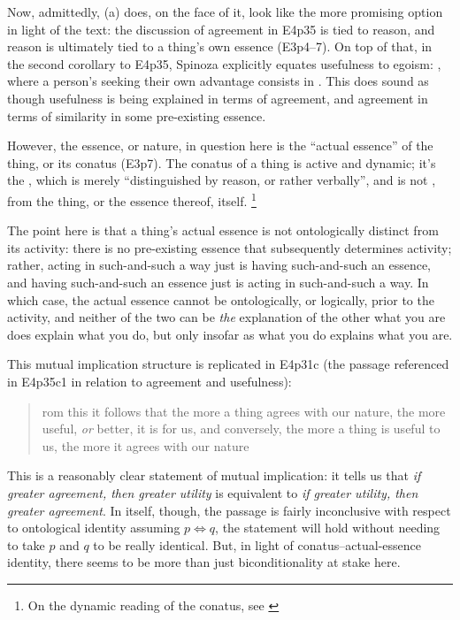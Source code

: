 \documentclass{article}
\newcommand{\dash}{\unskip{—}}
\begin{document}
Now, admittedly, (a) does, on the face of it, look like the more promising option in light of the text: the discussion of agreement in E4p35 is tied to reason, and reason is ultimately tied to a thing's own essence (E3p4–7). On top of that, in the second corollary to E4p35, Spinoza explicitly equates usefulness to egoism: , where a person's seeking their own advantage consists in . This does sound as though usefulness is being explained in terms of agreement, and agreement in terms of similarity in some pre-existing essence.

However, the essence, or nature, in question here is the \enquote{actual essence} of the thing, or its conatus (E3p7). The conatus of a thing is active and dynamic; it's the , which is merely \enquote{distinguished by reason, or rather verbally}, and is not , from the thing, or the essence thereof, itself.
\footnote{On the dynamic reading of the conatus, see \cite[][Part 4, ch. 13]{RenzExplainability}}

The point here is that a thing's actual essence is not ontologically distinct from its activity: there is no pre-existing essence that subsequently determines activity; rather, acting in such-and-such a way just is having such-and-such an essence, and having such-and-such an essence just is acting in such-and-such a way. In which case, the actual essence cannot be ontologically, or logically, prior to the activity, and neither of the two can be \emph{the} explanation of the other \dash what you are does explain what you do, but only insofar as what you do explains what you are.

This mutual implication structure is replicated in E4p31c (the passage referenced in E4p35c1 in relation to agreement and usefulness): \blockquote[][.]{rom this it follows that the more a thing agrees with our nature, the more useful, \emph{or} better, it is for us, and conversely, the more a thing is useful to us, the more it agrees with our nature} This is a reasonably clear statement of mutual implication: it tells us that \emph{if greater agreement, then greater utility} is equivalent to \emph{if greater utility, then greater agreement}. In itself, though, the passage is fairly inconclusive with respect to ontological identity \dash assuming $p \iff q$, the statement will hold without needing to take $p$ and $q$ to be really identical. But, in light of conatus–actual-essence identity, there seems to be more than just biconditionality at stake here.
\end{document}
